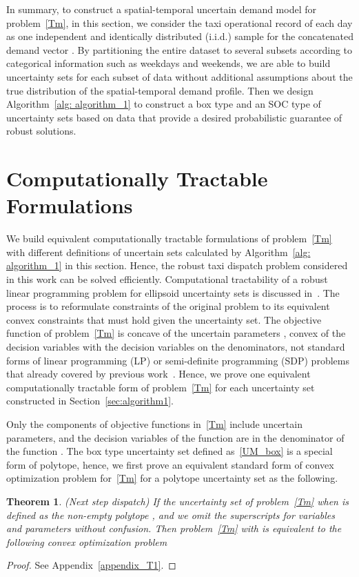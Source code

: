 \documentclass[10pt,twocolumn,twoside,english]{IEEEtran}
\newtheorem{theorem}{Theorem}
\begin{document}
In summary, to construct a spatial-temporal uncertain demand model for problem~\eqref{Tm}, in this section, we consider the taxi operational record of each day as one independent and identically distributed (i.i.d.) sample for the concatenated demand vector . By partitioning the entire dataset to several subsets according to categorical information such as weekdays and weekends, we are able to build uncertainty sets for each subset of data without additional assumptions about the true distribution of the spatial-temporal demand profile. Then we design Algorithm~\ref{alg: algorithm_1} to construct a box type and an SOC type of uncertainty sets based on data that provide a desired probabilistic guarantee of robust solutions.

\section{Computationally Tractable Formulations}
\label{sec:algorithm}
We build equivalent computationally tractable formulations of problem~\eqref{Tm} with different definitions of uncertain sets calculated by Algorithm~\ref{alg: algorithm_1} in this section. Hence, the robust taxi dispatch problem considered in this work can be solved efficiently. Computational tractability of a robust linear programming problem for ellipsoid uncertainty sets is discussed in~\cite{robustconvex}. The process is to reformulate constraints of the original problem to its equivalent convex constraints that must hold given the uncertainty set. The objective function of problem~\eqref{Tm} is concave of the uncertain parameters , convex of the decision variables  with the decision variables on the denominators, not standard forms of linear programming (LP) or semi-definite programming (SDP) problems that already covered by previous work~\cite{robustconvex, datad_robust}. Hence, we prove one equivalent computationally tractable form of problem~\eqref{Tm} for each uncertainty set constructed in Section~\ref{sec:algorithm1}.



Only the  components of objective functions in~\eqref{Tm} include uncertain parameters, and the decision variables of the function are in the denominator of the function . The box type uncertainty set defined as~\eqref{UM_box} is a special form of polytope, hence, we first prove an equivalent standard form of convex optimization problem for~\eqref{Tm} for a polytope uncertainty set as the following.
\begin{theorem} (Next step dispatch)
If the uncertainty set of problem~\eqref{Tm} when  is defined as the non-empty polytope , and we omit the superscripts  for variables and parameters without confusion. Then problem~\eqref{Tm} with  is equivalent to the following convex optimization problem
  
 \label{T1_convex}
\end{theorem}
\begin{proof}
See Appendix~\ref{appendix_T1}.
\end{proof}
\end{document}
